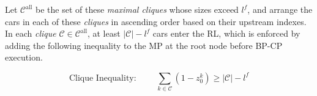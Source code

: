 \documentclass[12pt]{article}
\begin{document}
Let $\mathcal{C}^{\text{all}}$ be the set of these \textit{maximal cliques} whose sizes exceed $l^f$, and arrange the cars in each of these \textit{cliques} in ascending order based on their upstream indexes. %
In each \textit{clique} $\mathcal{C}\in \mathcal{C}^{\text{all}}$, at least $|\mathcal{C}|-l^f$ cars enter the RL, which is enforced by adding the following inequality to the MP at the root node before BP-CP execution.


\vspace{-5mm}

\begin{equation}\label{ieq1}
    \text{Clique Inequality: }\qquad \sum_{k\in \mathcal{C}}{(1-z^k_0)}\geqslant |\mathcal{C}|-l^f
\end{equation}
\end{document}
